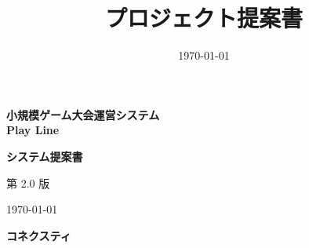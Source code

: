 \documentclass[a4paper]{ltjsarticle}
\title{プロジェクト提案書}
\author{}
\date{\today}
\begin{document}
\begin{titlepage}
    \centering
    \thispagestyle{empty} %

    \vspace*{3cm}

    {\Huge \bfseries 小規模ゲーム大会運営システム \\[0.3em] Play Line \par}

    \vspace{1.5cm}

    {\LARGE \bfseries システム提案書 \par}

    \vspace{3.5cm}

    {\Large 第 2.0 版 \par}

    \vfill %

    {\large \today \par}

    \vspace{1.2cm}

    {\Large \bfseries コネクスティ \par}

    \vspace{1cm}
\end{titlepage}

\clearpage
{}

\tableofcontents
\clearpage




%







\end{document}
